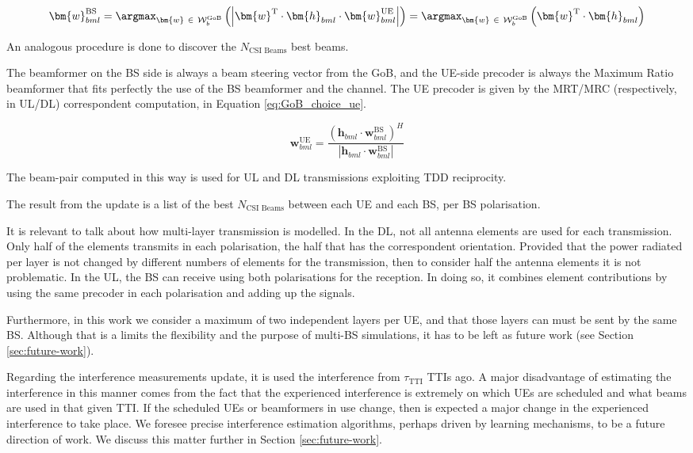 \begin{equation} \label{eq:GoB_choice}
    \bm{w}^\text{BS}_{bml} = \argmax_{\bm{w} \ \in \ \mathcal{W}^\text{GoB}_b} \left(\left| \bm{w}^\text{T} \cdot \bm{h}_{b m l} \cdot  \bm{w}^\text{UE}_{bml} \right|\right) = \argmax_{\bm{w} \ \in \ \mathcal{W}^\text{GoB}_b} \left( \bm{w}^\text{T} \cdot \bm{h}_{b m l} \right)
\end{equation}

An analogous procedure is done to discover the $N_\text{CSI Beams}$ best beams.

The beamformer on the BS side is always a beam steering vector from the GoB, and the UE-side precoder is always the Maximum Ratio beamformer that fits perfectly the use of the BS beamformer and the channel. The UE precoder is given by the MRT/MRC (respectively, in UL/DL) correspondent computation, in Equation \ref{eq:GoB_choice_ue}.


\begin{equation} \label{eq:GoB_choice_ue}
    \bm{w}^\text{UE}_{bml} = \frac{\left(\bm{h}_{b m l} \cdot \bm{w}^\text{BS}_{bml} \right)^H}{\left|\bm{h}_{b m l} \cdot \bm{w}^\text{BS}_{bml} \right|}
\end{equation}


The beam-pair computed in this way is used for UL and DL transmissions exploiting TDD reciprocity.

The result from the update is a list of the best $N_\text{CSI Beams}$ between each UE and each BS, per BS polarisation.


It is relevant to talk about how multi-layer transmission is modelled. In the DL, not all antenna elements are used for each transmission. Only half of the elements transmits in each polarisation, the half that has the correspondent orientation. Provided that the power radiated per layer is not changed by different numbers of elements for the transmission, then to consider half the antenna elements it is not problematic. In the UL, the BS can receive using both polarisations for the reception. In doing so, it combines element contributions by using the same precoder in each polarisation and adding up the signals. 

Furthermore, in this work we consider a maximum of two independent layers per UE, and that those layers can must be sent by the same BS. Although that is a limits the flexibility and the purpose of multi-BS simulations, it has to be left as future work (see Section \ref{sec:future-work}).


Regarding the interference measurements update, it is used the interference from $\tau_\text{TTI}$ TTIs ago. A major disadvantage of estimating the interference in this manner comes from the fact that the experienced interference is extremely on which UEs are scheduled and what beams are used in that given TTI. If the scheduled UEs or beamformers in use change, then is expected a major change in the experienced interference to take place. We foresee precise interference estimation algorithms, perhaps driven by learning mechanisms, to be a future direction of work. We discuss this matter further in Section \ref{sec:future-work}.

